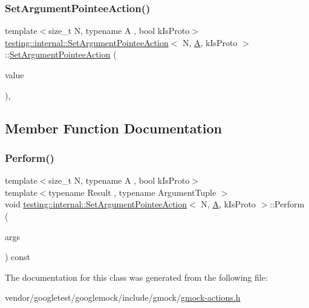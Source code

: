\subsubsection{\texorpdfstring{Set\+Argument\+Pointee\+Action()}{SetArgumentPointeeAction()}}
{\footnotesize\ttfamily template$<$size\+\_\+t N, typename A , bool k\+Is\+Proto$>$ \\
\hyperlink{classtesting_1_1internal_1_1_set_argument_pointee_action}{testing\+::internal\+::\+Set\+Argument\+Pointee\+Action}$<$ N, \hyperlink{namespacetesting_a5e9134d655d2fc9323902348083282e7}{A}, k\+Is\+Proto $>$\+::\hyperlink{classtesting_1_1internal_1_1_set_argument_pointee_action}{Set\+Argument\+Pointee\+Action} (\begin{DoxyParamCaption}\item[{const \hyperlink{namespacetesting_a5e9134d655d2fc9323902348083282e7}{A} \&}]{value }\end{DoxyParamCaption})\hspace{0.3cm}{\ttfamily [inline]}, {\ttfamily [explicit]}}



\subsection{Member Function Documentation}
\mbox{\label{classtesting_1_1internal_1_1_set_argument_pointee_action_a128320dcf991ff7f1a0087dab38b4014}} 
\subsubsection{\texorpdfstring{Perform()}{Perform()}}
{\footnotesize\ttfamily template$<$size\+\_\+t N, typename A , bool k\+Is\+Proto$>$ \\
template$<$typename Result , typename Argument\+Tuple $>$ \\
void \hyperlink{classtesting_1_1internal_1_1_set_argument_pointee_action}{testing\+::internal\+::\+Set\+Argument\+Pointee\+Action}$<$ N, \hyperlink{namespacetesting_a5e9134d655d2fc9323902348083282e7}{A}, k\+Is\+Proto $>$\+::Perform (\begin{DoxyParamCaption}\item[{const Argument\+Tuple \&}]{args }\end{DoxyParamCaption}) const\hspace{0.3cm}{\ttfamily [inline]}}



The documentation for this class was generated from the following file\+:\begin{DoxyCompactItemize}
\item 
vendor/googletest/googlemock/include/gmock/\hyperlink{gmock-actions_8h}{gmock-\/actions.\+h}\end{DoxyCompactItemize}
